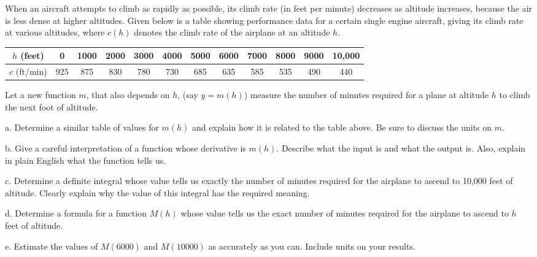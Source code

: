 \begin{exercises}
	\item When an aircraft attempts to climb as rapidly as
possible, its climb rate (in feet per minute) decreases as altitude
increases, because the air is less dense at higher altitudes.
Given below is a table showing performance data for a certain
single engine aircraft, giving its climb rate at various altitudes, where  $c(h)$ denotes the climb rate of the airplane at an altitude $h$.
\begingroup
\footnotesize
\begin{center}
  \begin{tabular}{|c||c|c|c|c|c|c|c|c|c|c|c|}
    \hline
    $h$ (feet)&0&1000&2000&3000&4000&5000&6000&7000&8000&9000&10,000\\
    \hline
    $c$ (ft/min)&925&875&830&780&730&685&635&585&535&490&440\\
    \hline
  \end{tabular}
\end{center}
\endgroup

 Let a new function $m$, that also depends on $h$, (say $y = m(h)$) measure
the number of minutes required for a plane at altitude $h$ to climb the
next foot of altitude.
\be
	\item[a.] Determine a similar table of values for $m(h)$ and explain how it is related to the table above.  Be sure to discuss the units on $m$.

	\item[b.] Give a careful interpretation of a function whose derivative
is $m(h)$.  Describe what the input is and what the output is.  Also,
explain in plain English what the function tells us.

	\item[c.] Determine a definite integral whose value tells us exactly the number of minutes required for the airplane to ascend to
10,000 feet of altitude.  Clearly explain why the value of this integral has the required meaning.  

	\item[d.] Determine a formula for a function $M(h)$ whose value tells us the exact number of minutes required for the airplane to ascend to $h$ feet of altitude.

	\item[e.] Estimate the values of $M(6000)$ and $M(10000)$ as accurately as you can.  Include units on your results.
\ee

\end{exercises}
\afterexercises
